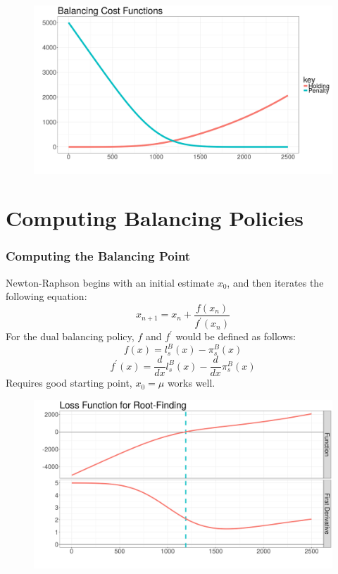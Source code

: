 \documentclass{beamer}
\begin{document}

\begin{frame}
\begin{figure}
\includegraphics[width=\textwidth]{cost_function_slides}
\end{figure}
\end{frame}


\section{Computing Balancing Policies}


\begin{frame}
\frametitle{Computing the Balancing Point}
Newton-Raphson begins with an initial estimate $x_0$, and then iterates the following equation:
$$
	x_{n+1} = x_n + \frac{f(x_n)}{f^{\prime}(x_n)}
$$
For the dual balancing policy, $f$ and $f^{\prime}$ would be defined as follows:
$$
	f(x) = l_s^B(x) - \pi_s^B(x) 
$$
$$
	f^{\prime}(x) =  \frac{d}{dx} l_s^B(x) - \frac{d}{dx} \pi_s^B(x) 
$$
Requires good starting point, $x_0 = \mu$ works well. 
\end{frame}


\begin{frame}
\begin{figure}
\includegraphics[width=\textwidth]{root_function_slides}
\end{figure}
\end{frame}
\end{document}
